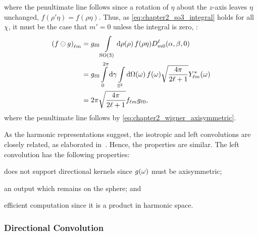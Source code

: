 %
where the penultimate line follows since a rotation of \({\eta}\) about the \(z\)-axis leaves \({\eta}\) unchanged, \ie{} \(f(\rho'\eta) = f(\rho\eta)\).
Thus, as \cref{eq:chapter2_so3_integral} holds for all \(\chi{}\), it must be the case that \(m'=0\) unless the integral is zero, \ie{}:
%
\begin{align}
	{(f \circleddash g)}_{\ell m}
	 & = {g}_{\ell 0} \int\limits_{\text{SO(3)}} \dd{\rho(\rho)} f(\rho\eta) D^{\ell}_{m0} (\alpha,\beta,0) \nonumber{}                                               \\
	 & = {g}_{\ell 0} \int\limits_{0}^{2\pi} \dd{\gamma} \int\limits_{\mathbb{S}^{2}} \dd{\Omega(\omega)} f(\omega) \sqrt{\frac{4\pi}{2\ell+1}} {Y}_{\ell m}^{\ast}(\omega) \nonumber{} \\
	 & = 2\pi \sqrt{\frac{4\pi}{2\ell+1}} {f}_{\ell m} {g}_{\ell 0},
\end{align}
%
where the penultimate line follows by \cref{eq:chapter2_wigner_axisymmetric}.

As the harmonic representations suggest, the isotropic and left convolutions are closely related, as elaborated in~\cite{Kennedy2011}.
Hence, the properties are similar.
The left convolution has the following properties:
%
\begin{inparaenum}[(i)]
	\item does not support directional kernels since \(g(\omega)\) must be axisymmetric;
	\item an output which remains on the sphere; and
	\item efficient computation since it is a product in harmonic space.
\end{inparaenum}

\subsubsection{Directional Convolution}

